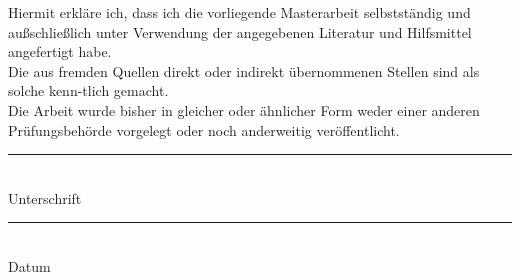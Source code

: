 \documentclass[thesis.tex]{subfiles}
\newcommand{\doublesignature}[3]{%
  \parbox{\textwidth}{
    \parbox{7cm}{
      \rule{6cm}{1pt}\\
       #1 
    }
    \hfill
    \parbox{7cm}{
      \rule{6cm}{1pt}\\
      #2
    }
  }
}
\begin{document}


Hiermit erkläre ich, dass ich die vorliegende Masterarbeit selbstständig und außschließlich unter Verwendung der angegebenen Literatur und Hilfsmittel angefertigt habe.\\
Die aus fremden Quellen direkt oder indirekt übernommenen Stellen sind als solche kenn-tlich gemacht.\\

Die Arbeit wurde bisher in gleicher oder ähnlicher Form weder einer anderen Prüfungsbehörde vorgelegt oder noch anderweitig veröffentlicht.
\vspace{100pt}

\doublesignature{Unterschrift}{Datum}

\newpage
\end{document}
